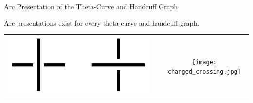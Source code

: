 \begin{frame}{Arc Presentation of the Theta-Curve and Handcuff Graph}
	\begin{thm}
    Arc presentations exist for every theta-curve and handcuff graph. 
	\end{thm}
	\mypf
    \begin{center}
    \begin{tabu}{c c c}
        \includegraphics[width=0.4\linewidth]{figure/crossings.png} &
        \raisebox{1cm}{$\xmapsto{}$} &
        \texttt{[image: changed\_crossing.jpg]}
    \end{tabu}
    \end{center}
\end{frame}

